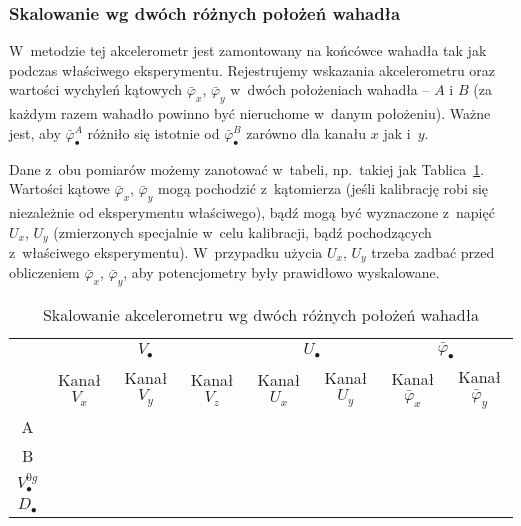 \documentclass[paper=a4,DIV=12]{lpas}
\begin{document}
\subsubsection{Skalowanie wg dwóch różnych położeń wahadła}
\label{sec:BDRBE}

W~metodzie tej akcelerometr jest zamontowany na końcówce wahadła tak jak
podczas właściwego eksperymentu. Rejestrujemy wskazania akcelerometru
oraz wartości wychyleń kątowych $\bar{\varphi}_x$, $\bar{\varphi}_y$ w~dwóch
położeniach wahadła -- $A$ i $B$ (za każdym razem wahadło powinno być
nieruchome w~danym położeniu). Ważne jest, aby $\bar{\varphi}_{\bullet}^A$
różniło się istotnie od $\bar{\varphi}_{\bullet}^B$ zarówno dla kanału $x$ jak
i~$y$.

Dane z~obu pomiarów możemy zanotować w~tabeli, np.~takiej jak
Tablica~\ref{tab:22DGI}. Wartości kątowe $\bar{\varphi}_x$, $\bar{\varphi}_y$
mogą pochodzić z~kątomierza (jeśli kalibrację robi się niezależnie od
eksperymentu właściwego), bądź mogą być wyznaczone z~napięć $U_x$, $U_y$
(zmierzonych specjalnie w~celu kalibracji, bądź pochodzących z~właściwego
eksperymentu). W~przypadku użycia $U_x$, $U_y$ trzeba zadbać przed obliczeniem
$\bar{\varphi}_x$, $\bar{\varphi}_y$, aby potencjometry były prawidłowo
wyskalowane.
\begin{table}[htbp]
  \caption{Skalowanie akcelerometru wg dwóch różnych położeń wahadła}
  \label{tab:22DGI}
  \begin{tabular}{c|c|c|c|c|c|c|c|}
    \cline{2-8}
    & \multicolumn{3}{|c|}{$V_{\bullet}$}
    & \multicolumn{2}{|c|}{$U_{\bullet}$}
    & \multicolumn{2}{|c|}{$\bar{\varphi}_{\bullet}$}
    \\
    \cline{2-8}
    & Kanał $V_{x}$ & Kanał $V_{y}$ & Kanał $V_{z}$
    & Kanał $U_{x}$ & Kanał $U_{y}$
    & Kanał $\bar{\varphi}_{x}$ & Kanał $\bar{\varphi}_{y}$
    \\
    \hline
    \multicolumn{1}{|c|}{A} & & & & & & & \\ \hline
    \multicolumn{1}{|c|}{B} & & & & & & & \\ \hline
    \multicolumn{1}{|c|}{$V_{\bullet}^{0g}$}  & & & & \multicolumn{4}{|c}{} \\ \cline{1-4}
    \multicolumn{1}{|c|}{$D_{\bullet}$}  & & & & \multicolumn{4}{|c}{} \\ \cline{1-4}
  \end{tabular}
\end{table}
\end{document}
